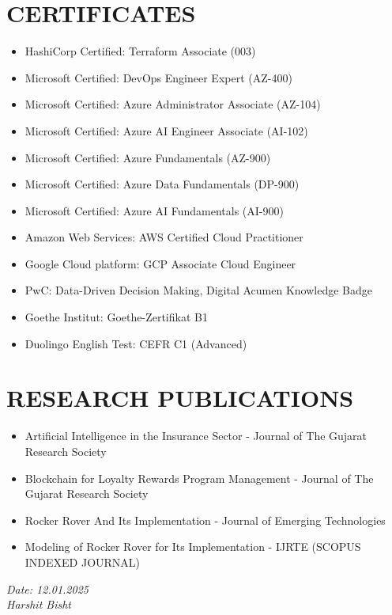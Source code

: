 \documentclass[11pt,a4paper]{article}
\begin{document}
\section*{CERTIFICATES}
\begin{itemize}
    \item HashiCorp Certified: Terraform Associate (003)
    \item Microsoft Certified: DevOps Engineer Expert (AZ-400)
    \item Microsoft Certified: Azure Administrator Associate (AZ-104)
    \item Microsoft Certified: Azure AI Engineer Associate (AI-102)
    \item Microsoft Certified: Azure Fundamentals (AZ-900)
    \item Microsoft Certified: Azure Data Fundamentals (DP-900)
    \item Microsoft Certified: Azure AI Fundamentals (AI-900)
    \item Amazon Web Services: AWS Certified Cloud Practitioner
    \item Google Cloud platform: GCP Associate Cloud Engineer
    \item PwC: Data-Driven Decision Making, Digital Acumen Knowledge Badge
    \item Goethe Institut: Goethe-Zertifikat B1
    \item Duolingo English Test: CEFR C1 (Advanced)
\end{itemize}

\section*{RESEARCH PUBLICATIONS}
\begin{itemize}
    \item Artificial Intelligence in the Insurance Sector - Journal of The Gujarat Research Society
    \item Blockchain for Loyalty Rewards Program Management - Journal of The Gujarat Research Society
    \item Rocker Rover And Its Implementation - Journal of Emerging Technologies
    \item Modeling of Rocker Rover for Its Implementation - IJRTE (SCOPUS INDEXED JOURNAL)
\end{itemize}

\vfill %
\noindent %
\begin{flushright} %
    \textit{Date: 12.01.2025}\\ %
    \textit{Harshit Bisht} %
\end{flushright}
\end{document}
